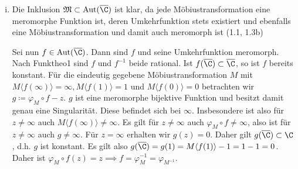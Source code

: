 \documentclass{article}
\begin{document}
\begin{enumerate}[(a)]
\begin{enumerate}[(i)]
        \item Die Inklusion $\mathfrak{M} \subset \operatorname{Aut}(\overline{\C})$ ist klar, da jede Möbiustransformation eine meromorphe Funktion ist, deren Umkehrfunktion stets existiert und ebenfalls eine Möbiustransformation und damit auch meromorph ist (1.1, 1.3b)
        
        Sei nun $f \in \operatorname{Aut}(\overline{\C})$. Dann sind $f$ und seine Umkehrfunktion meromorph.
        Nach Funktheo1 sind $f$ und $f^{-1}$ beide rational.
        Ist $f(\overline{\C}) \subset \overline{\C}$, so ist $f$ bereits konstant.
        Für die eindeutig gegebene Möbiustransformation $M$ mit $M \langle f(\infty) \rangle = \infty, M\langle f(1) \rangle = 1$ und $M\langle f(0) \rangle = 0$ betrachten wir $g \coloneqq \varphi_M \circ f - z$. 
        $g$ ist eine meromorphe bijektive Funktion und besitzt damit genau eine Singularität. Diese befindet sich bei $\infty$. Insbesondere ist also für $z\neq \infty$ auch $M \langle f(\infty) \rangle \neq \infty$.
        Es gilt für $z \neq \infty$ auch $\varphi_M \circ f \neq \infty$, also ist für $z\neq \infty$ auch $g \neq \infty$.
        Für $z = \infty$ erhalten wir $g(z) = 0$. Daher gilt $g(\overline{\C}) \subset \C$, d.h. $g$ ist konstant.
        Es gilt also $g(\overline{\C}) = g(1) = M\langle f(1) \rangle - 1 = 1 - 1 = 0$.
        Daher ist $\varphi_M \circ f (z) = z \implies f = \varphi_M^{-1} = \varphi_{M^{-1}}$.
    \end{enumerate}
\end{enumerate}
\end{document}
